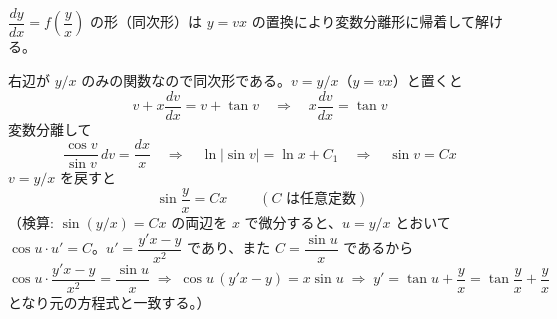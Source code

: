
$\dfrac{dy}{dx} = f\!\left(\dfrac{y}{x}\right)$ の形（同次形）は $y = vx$ の置換により変数分離形に帰着して解ける。

右辺が $y/x$ のみの関数なので同次形である。$v = y/x$（$y=vx$）と置くと
\[
v + x\frac{dv}{dx} = v + \tan v
\quad\Longrightarrow\quad
x\frac{dv}{dx} = \tan v
\]
変数分離して
\[
\frac{\cos v}{\sin v}\,dv = \frac{dx}{x}
\quad\Longrightarrow\quad
\ln|\sin v| = \ln x + C_{1}
\quad\Longrightarrow\quad
\sin v = Cx
\]
$v = y/x$ を戻すと
\[
\boxed{\; \sin\frac{y}{x} = Cx \;}
\qquad (C \text{ は任意定数})
\]
（検算: $\sin(y/x) = Cx$ の両辺を $x$ で微分すると、$u=y/x$ とおいて $\cos u \cdot u' = C$。$u' = \dfrac{y'x - y}{x^{2}}$ であり、また $C = \dfrac{\sin u}{x}$ であるから
\[
\cos u\cdot\frac{y'x-y}{x^{2}} = \frac{\sin u}{x}
\;\Longrightarrow\;
\cos u\,(y'x - y) = x\sin u
\;\Longrightarrow\;
y' = \tan u + \frac{y}{x} = \tan\frac{y}{x} + \frac{y}{x}
\]
となり元の方程式と一致する。）
